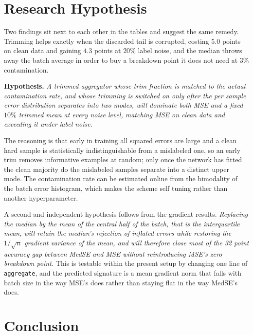 \documentclass[12pt]{article}
\begin{document}
\section{Research Hypothesis}

Two findings sit next to each other in the tables and suggest the same remedy. Trimming helps exactly when the discarded tail is corrupted, costing $5.0$ points on clean data and gaining $4.3$ points at $20\%$ label noise, and the median throws away the batch average in order to buy a breakdown point it does not need at $3\%$ contamination.

\textbf{Hypothesis.} \emph{A trimmed aggregator whose trim fraction is matched to the actual contamination rate, and whose trimming is switched on only after the per sample error distribution separates into two modes, will dominate both MSE and a fixed $10\%$ trimmed mean at every noise level, matching MSE on clean data and exceeding it under label noise.}

The reasoning is that early in training all squared errors are large and a clean hard sample is statistically indistinguishable from a mislabeled one, so an early trim removes informative examples at random; only once the network has fitted the clean majority do the mislabeled samples separate into a distinct upper mode. The contamination rate can be estimated online from the bimodality of the batch error histogram, which makes the scheme self tuning rather than another hyperparameter.

A second and independent hypothesis follows from the gradient results. \emph{Replacing the median by the mean of the central half of the batch, that is the interquartile mean, will retain the median's rejection of inflated errors while restoring the $1/\sqrt{n}$ gradient variance of the mean, and will therefore close most of the 32 point accuracy gap between MedSE and MSE without reintroducing MSE's zero breakdown point.} This is testable within the present setup by changing one line of \texttt{aggregate}, and the predicted signature is a mean gradient norm that falls with batch size in the way MSE's does rather than staying flat in the way MedSE's does.

\section{Conclusion}
\end{document}

